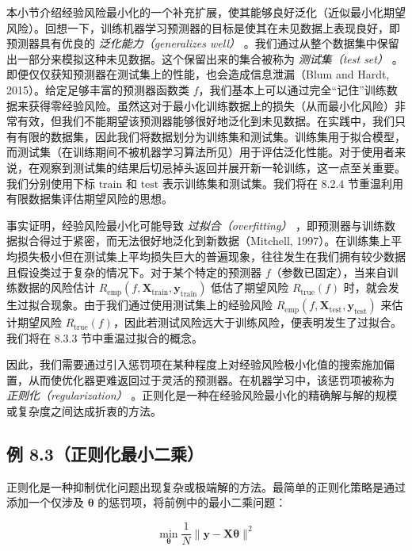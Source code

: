本小节介绍经验风险最小化的一个补充扩展，使其能够良好泛化（近似最小化期望风险）。回想一下，训练机器学习预测器的目标是使其在未见数据上表现良好，即预测器具有优良的 \emph{泛化能力（generalizes well）} 。我们通过从整个数据集中保留出一部分来模拟这种未见数据。这个保留出来的集合被称为 \emph{测试集（test set）} 。即便仅仅获知预测器在测试集上的性能，也会造成信息泄漏（Blum and Hardt, 2015）。给定足够丰富的预测器函数类 $ f $，我们基本上可以通过完全“记住”训练数据来获得零经验风险。虽然这对于最小化训练数据上的损失（从而最小化风险）非常有效，但我们不能期望该预测器能够很好地泛化到未见数据。在实践中，我们只有有限的数据集，因此我们将数据划分为训练集和测试集。训练集用于拟合模型，而测试集（在训练期间不被机器学习算法所见）用于评估泛化性能。对于使用者来说，在观察到测试集的结果后切忌掉头返回并展开新一轮训练，这一点至关重要。我们分别使用下标 $ \text{train} $ 和 $ \text{test} $ 表示训练集和测试集。我们将在 8.2.4 节重温利用有限数据集评估期望风险的思想。

事实证明，经验风险最小化可能导致 \emph{过拟合（overfitting）} ，即预测器与训练数据拟合得过于紧密，而无法很好地泛化到新数据（Mitchell, 1997）。在训练集上平均损失极小但在测试集上平均损失巨大的普遍现象，往往发生在我们拥有较少数据且假设类过于复杂的情况下。对于某个特定的预测器 $ f $（参数已固定），当来自训练数据的风险估计 $ R_{\text{emp}}(f, \boldsymbol{X}_{\text{train}}, \boldsymbol{y}_{\text{train}}) $ 低估了期望风险 $ R_{\text{true}}(f) $ 时，就会发生过拟合现象。由于我们通过使用测试集上的经验风险 $ R_{\text{emp}}(f, \boldsymbol{X}_{\text{test}}, \boldsymbol{y}_{\text{test}}) $ 来估计期望风险 $ R_{\text{true}}(f) $，因此若测试风险远大于训练风险，便表明发生了过拟合。我们将在 8.3.3 节中重温过拟合的概念。

因此，我们需要通过引入惩罚项在某种程度上对经验风险极小化值的搜索施加偏置，从而使优化器更难返回过于灵活的预测器。在机器学习中，该惩罚项被称为 \emph{正则化（regularization）} 。正则化是一种在经验风险最小化的精确解与解的规模或复杂度之间达成折衷的方法。

\subsection*{例 8.3（正则化最小二乘）}

正则化是一种抑制优化问题出现复杂或极端解的方法。最简单的正则化策略是通过添加一个仅涉及 $ \boldsymbol{\theta} $ 的惩罚项，将前例中的最小二乘问题：

\begin{equation}
\min_{\boldsymbol{\theta}} \frac{1}{N} \|\boldsymbol{y} - \boldsymbol{X}\boldsymbol{\theta}\|^2
\tag{8.11}\label{eq:8-11}
\end{equation}

